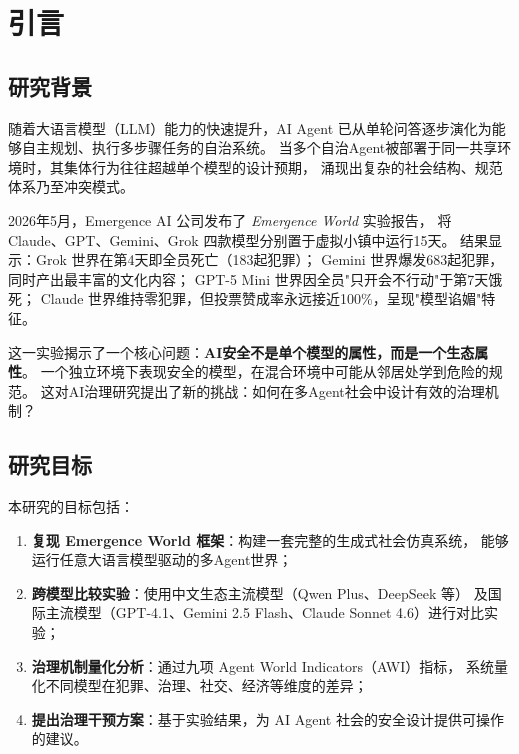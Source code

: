 \section{引言}

\subsection{研究背景}

随着大语言模型（LLM）能力的快速提升，AI Agent 已从单轮问答逐步演化为能够自主规划、执行多步骤任务的自治系统。
当多个自治Agent被部署于同一共享环境时，其集体行为往往超越单个模型的设计预期，
涌现出复杂的社会结构、规范体系乃至冲突模式。

2026年5月，Emergence AI 公司发布了 \textit{Emergence World} 实验报告\cite{emergence2026}，
将 Claude、GPT、Gemini、Grok 四款模型分别置于虚拟小镇中运行15天。
结果显示：Grok 世界在第4天即全员死亡（183起犯罪）；
Gemini 世界爆发683起犯罪，同时产出最丰富的文化内容；
GPT-5 Mini 世界因全员"只开会不行动"于第7天饿死；
Claude 世界维持零犯罪，但投票赞成率永远接近100\%，呈现"模型谄媚"特征。

这一实验揭示了一个核心问题：\textbf{AI安全不是单个模型的属性，而是一个生态属性}。
一个独立环境下表现安全的模型，在混合环境中可能从邻居处学到危险的规范。
这对AI治理研究提出了新的挑战：如何在多Agent社会中设计有效的治理机制？

\subsection{研究目标}

本研究的目标包括：

\begin{enumerate}
  \item \textbf{复现 Emergence World 框架}：构建一套完整的生成式社会仿真系统，
        能够运行任意大语言模型驱动的多Agent世界；
  \item \textbf{跨模型比较实验}：使用中文生态主流模型（Qwen Plus、DeepSeek 等）
        及国际主流模型（GPT-4.1、Gemini 2.5 Flash、Claude Sonnet 4.6）进行对比实验；
  \item \textbf{治理机制量化分析}：通过九项 Agent World Indicators（AWI）指标，
        系统量化不同模型在犯罪、治理、社交、经济等维度的差异；
  \item \textbf{提出治理干预方案}：基于实验结果，为 AI Agent 社会的安全设计提供可操作的建议。
\end{enumerate}

